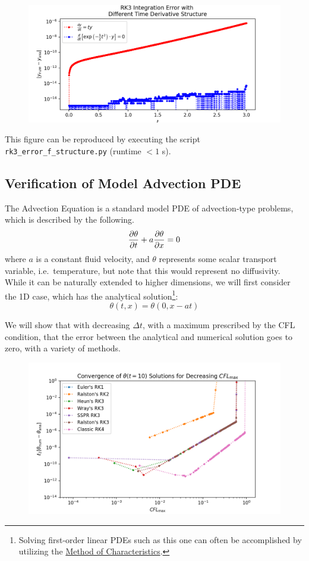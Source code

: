 \documentclass[12pt, reqno]{amsart}
\begin{document}
\begin{figure}[H]
    \centering
    \includegraphics[width = 1\linewidth]{RK3 Error, Time Derivative Structure.png}
\end{figure}
This figure can be reproduced by executing the script \texttt{rk3\_error\_f\_structure.py} (runtime $<1$ s).

\subsection{Verification of Model Advection PDE}
The Advection Equation is a standard model PDE of advection-type problems, which is described by the following.
\begin{equation}
    \pdv{\theta}{t} + a \pdv{\theta}{x} = 0
\end{equation}
where $a$ is a constant fluid velocity, and $\theta$ represents some scalar transport variable, i.e.\ temperature, but note that this would represent no diffusivity. While it can be naturally extended to higher dimensions, we will first consider the 1D case, which has the analytical solution\footnote{Solving first-order linear PDEs such as this one can often be accomplished by utilizing the \href{https://en.wikipedia.org/wiki/Method_of_characteristics}{Method of Characteristics}.}:
\begin{equation}
    \theta(t, x) = \theta(0, x - at)
\end{equation}

We will show that with decreasing $\Delta t$, with a maximum prescribed by the CFL condition, that the error between the analytical and numerical solution goes to zero, with a variety of methods.

\begin{figure}[H]
    \centering
    \includegraphics[width = 1\linewidth]{advection_error.png}
\end{figure}
\end{document}
